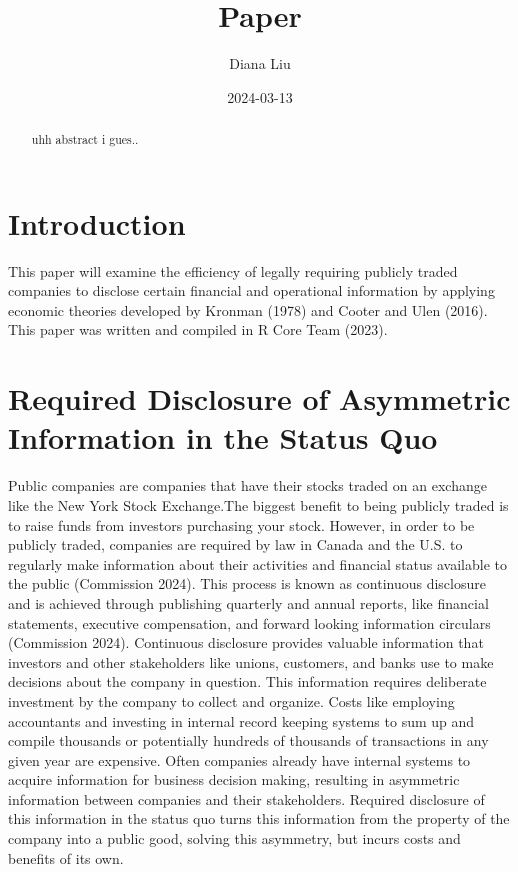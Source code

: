 \documentclass[
  12pt,
  letterpaper,
  DIV=11,
  numbers=noendperiod]{scrartcl}
\title{Paper}
\author{Diana Liu}
\date{2024-03-13}
\begin{document}
\maketitle
\begin{abstract}
uhh abstract i gues..
\end{abstract}
\ifdefined\Shaded\renewenvironment{Shaded}{\begin{tcolorbox}[breakable, boxrule=0pt, frame hidden, interior hidden, borderline west={3pt}{0pt}{shadecolor}, enhanced, sharp corners]}{\end{tcolorbox}}\fi

\hypertarget{introduction}{%
\section{Introduction}\label{introduction}}

This paper will examine the efficiency of legally requiring publicly
traded companies to disclose certain financial and operational
information by applying economic theories developed by Kronman (1978)
and Cooter and Ulen (2016). This paper was written and compiled in R
Core Team (2023).

\hypertarget{required-disclosure-of-asymmetric-information-in-the-status-quo}{%
\section{Required Disclosure of Asymmetric Information in the Status
Quo}\label{required-disclosure-of-asymmetric-information-in-the-status-quo}}

Public companies are companies that have their stocks traded on an
exchange like the New York Stock Exchange.The biggest benefit to being
publicly traded is to raise funds from investors purchasing your stock.
However, in order to be publicly traded, companies are required by law
in Canada and the U.S. to regularly make information about their
activities and financial status available to the public (Commission
2024). This process is known as continuous disclosure and is achieved
through publishing quarterly and annual reports, like financial
statements, executive compensation, and forward looking information
circulars (Commission 2024). Continuous disclosure provides valuable
information that investors and other stakeholders like unions,
customers, and banks use to make decisions about the company in
question. This information requires deliberate investment by the company
to collect and organize. Costs like employing accountants and investing
in internal record keeping systems to sum up and compile thousands or
potentially hundreds of thousands of transactions in any given year are
expensive. Often companies already have internal systems to acquire
information for business decision making, resulting in asymmetric
information between companies and their stakeholders. Required
disclosure of this information in the status quo turns this information
from the property of the company into a public good, solving this
asymmetry, but incurs costs and benefits of its own.
\end{document}
